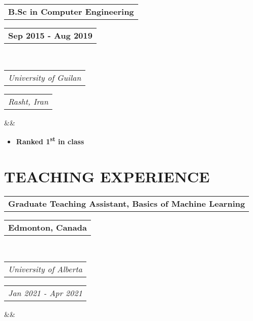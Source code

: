 \documentclass[11pt,a4paper,roman,colorlinks,linkcolor=blue,filecolor=magenta,urlcolor=cyan]{moderncv}        %
\makeatletter
\newcommand*{\customcventry}[7][.25em]{
  \begin{tabular}{@{}l} 
    {\bfseries #4}
  \end{tabular}
  \hfill%
  \begin{tabular}{l@{}}
     {\bfseries #5}
  \end{tabular} \\
  \begin{tabular}{@{}l} 
    {\itshape #3}
  \end{tabular}
  \hfill%
  \begin{tabular}{l@{}}
     {\itshape #2}
  \end{tabular}
  \ifx&#7&%
  \else{\\%
    \begin{minipage}{\maincolumnwidth}%
      \small#7%
    \end{minipage}}\fi%
  \par\addvspace{#1}}
\newcommand*{\customcvproject}[4][.25em]{%
  \begin{tabular}{@{}l} 
    {\bfseries #2} %
  \end{tabular}
  \hfill
  \begin{tabular}{l@{}}
    {#3} %
  \end{tabular}%
  \ifx&#4&%
  \else
    \\ %
    \begin{minipage}{\maincolumnwidth}%
      \small#4 %
    \end{minipage}%
  \fi
  \par\addvspace{#1}%
}
\makeatother
\begin{document}

{\customcventry{Rasht, Iran}{University of Guilan}{B.Sc in Computer Engineering}{Sep 2015 - Aug 2019}{}{}}
\begin{itemize}
    \item \textbf{Ranked 1\textsuperscript{st} in class}
\end{itemize}








\vspace{-2mm}

\section{TEACHING EXPERIENCE}
{\customcventry{Jan 2021 - Apr 2021}{University of Alberta}{Graduate Teaching Assistant, Basics of Machine Learning}{Edmonton, Canada}{}{}

}
\end{document}
